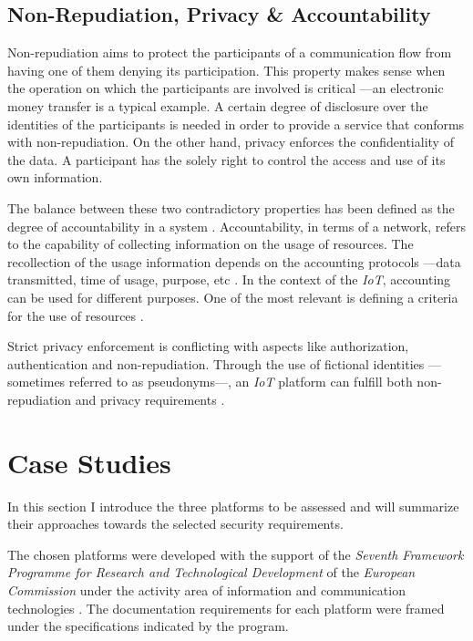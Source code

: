 \documentclass[journal]{IEEEtran}
\begin{document}
  \subsection{Non-Repudiation, Privacy \& Accountability}
  Non-repudiation aims to protect the participants of a communication flow from having one of them denying its participation. This property makes sense when the operation on which the participants are involved is critical ---an electronic money transfer is a typical example. A certain degree of disclosure over the identities of the participants is needed in order to provide a service that conforms with non-repudiation. On the other hand, privacy enforces the confidentiality of the data. A participant has the solely right to control the access and use of its own information.

  The balance between these two contradictory properties has been defined as the degree of accountability in a system \cite{Bassi2013}. Accountability, in terms of a network, refers to the capability of collecting information on the usage of resources. The recollection of the usage information depends on the accounting protocols ---data transmitted, time of usage, purpose, etc  \cite{Sklavos2007}. In the context of the \emph{IoT}, accounting can be used for different purposes. One of the most relevant is defining a criteria for the use of resources \cite{Bauge2010}.

  Strict privacy enforcement is conflicting with aspects like authorization, authentication and non-repudiation. Through the use of fictional identities ---sometimes referred to as pseudonyms---, an \emph{IoT} platform can fulfill both non-repudiation and privacy requirements \cite{Baldini2012}. 
  
\section{Case Studies}
  In this section I introduce the three platforms to be assessed and will summarize their approaches towards the selected security requirements.

  The chosen platforms were developed with the support of the \emph{Seventh Framework Programme for Research and Technological Development} of the \emph{European Commission} under the activity area of information and communication technologies \cite{FP7}\cite{FP7-ICT}\cite{ICT}. The documentation requirements for each platform were framed under the specifications indicated by the program.
\end{document}

